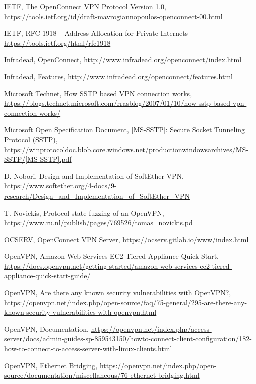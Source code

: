 \begin{thebibliography}{10}
  IETF, The OpenConnect VPN Protocol Version 1.0,
  \url{https://tools.ietf.org/id/draft-mavrogiannopoulos-openconnect-00.html}

  IETF, RFC 1918 -- Address Allocation for Private Internets
  \url{https://tools.ietf.org/html/rfc1918}

  Infradead, OpenConnect,
  \url{http://www.infradead.org/openconnect/index.html}

  Infradead, Features,
  \url{http://www.infradead.org/openconnect/features.html}

  Microsoft Technet, How SSTP based VPN connection works,
  \url{https://blogs.technet.microsoft.com/rrasblog/2007/01/10/how-sstp-based-vpn-connection-works/}

  Microsoft Open Specification Document, [MS-SSTP]: Secure Socket Tunneling Protocol (SSTP),
  \url{https://winprotocoldoc.blob.core.windows.net/productionwindowsarchives/MS-SSTP/[MS-SSTP].pdf}

  D. Nobori, Design and Implementation of SoftEther VPN,
  \url{https://www.softether.org/4-docs/9-research/Design_and_Implementation_of_SoftEther_VPN}

  T. Novickis, Protocol state fuzzing of an OpenVPN,
  \url{https://www.ru.nl/publish/pages/769526/tomas_novickis.pd}

  OCSERV, OpenConnect VPN Server,
  \url{https://ocserv.gitlab.io/www/index.html}

  OpenVPN, Amazon Web Services EC2 Tiered Appliance Quick Start,
  \url{https://docs.openvpn.net/getting-started/amazon-web-services-ec2-tiered-appliance-quick-start-guide/}

  OpenVPN, Are there any known security vulnerabilities with OpenVPN?,
  \url{https://openvpn.net/index.php/open-source/faq/75-general/295-are-there-any-known-security-vulnerabilities-with-openvpn.html}

  OpenVPN, Documentation,
  \url{https://openvpn.net/index.php/access-server/docs/admin-guides-sp-859543150/howto-connect-client-configuration/182-how-to-connect-to-access-server-with-linux-clients.html}

  OpenVPN, Ethernet Bridging,
  \url{https://openvpn.net/index.php/open-source/documentation/miscellaneous/76-ethernet-bridging.html}


\end{thebibliography}
